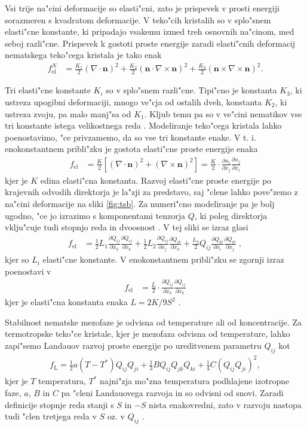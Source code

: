 \documentclass[12pt,twoside,openright,final]{report}
\renewcommand{\vec}{\mathbf}
\newcommand{\qodv}[2]{\ensuremath{\frac{\partial Q_{#1}}{\partial x_{#2}}}}
\newcommand{\nodv}[2]{\ensuremath{\frac{\partial n_{#1}}{\partial x_{#2}}}}
\begin{document}
Vsi trije na"cini deformacije so elasti"cni, zato je prispevek v prosti energiji sorazmeren s kvadratom deformacije. 
V teko"cih kristalih so v splo"snem elasti"cne konstante, ki pripadajo vsakemu izmed treh osnovnih na"cinom, med seboj razli"cne. 
Prispevek k gostoti proste energije zaradi elasti"cnih deformacij nematskega teko"cega kristala je tako enak
\begin{align}
 f_{\mathrm{el}}^N &= \frac{K_1}{2} (\nabla \cdot \vec n)^2 + \frac{K_2}{2} (\vec n \cdot \nabla \times \vec n)^2 + \frac{K_3}{2} (\vec n \times \nabla \times \vec n)^2. 
\end{align}

Tri elasti"cne konstante $K_i$ so v splo"snem razli"cne. Tipi"cno je konstanta $K_3$, ki ustreza upogibni deformaciji, mnogo ve"cja od ostalih dveh, konstanta $K_2$, ki ustreza zvoju, pa malo manj"sa od $K_1$. 
Kljub temu pa so v ve"cini nematikov vse tri konstante istega velikostnega reda \cite{degennes}. 
Modeliranje teko"cega kristala lahko poenostavimo, "ce privzamemo, da so vse tri konstante enake. 
V t. i. enokonstantnem pribli"zku je gostota elasti"cne proste energije enaka
\begin{align}
 f_{\mathrm{el}} &= \frac{K}{2} \left[(\nabla \cdot \vec n)^2 + (\nabla \times \vec n)^2\right] = \frac{K}{2} \cdot \nodv{i}{j}\nodv{j}{i}
\end{align}
kjer je $K$ edina elasti"cna konstanta.
Razvoj elasti"cne proste energije po krajevnih odvodih direktorja je la"zji za predstavo, saj "clene lahko pove"zemo z na"cini deformacije na sliki \ref{fig:tsb}. 
Za numeri"cno modeliranje pa je bolj ugodno, "ce jo izrazimo s komponentami tenzorja $Q$, ki poleg direktorja vklju"cuje tudi stopnjo reda in dvoosnost \cite{copar-phd}. 
V tej sliki se izraz glasi
\begin{align}
 f_{\mathrm{el}} &= \frac{1}{2}L_1\qodv{ij}{k}\qodv{ij}{k} + \frac{1}{2}L_2 \qodv{ij}{j}\qodv{ik}{k} + \frac{L_3}{2}Q_{ij}\qodv{kl}{i}\qodv{kl}{j}\;,
\end{align}
kjer so $L_i$ elasti"cne konstante. V enokonstantnem pribli"zku se zgornji izraz poenostavi v 
\begin{align}
f_{\mathrm{el}} &= \frac{L}{2} \cdot \qodv{ij}{k}\qodv{ij}{k} 
\end{align}
kjer je elasti"cna konstanta enaka $L = 2K/9S^2$ \cite{ravnik-zumer-ldg}. 

Stabilnost nematske mezofaze je odvisna od temperature ali od koncentracije. 
Za termotropske teko"ce kristale, kjer je mezofaza odvisna od temperature, lahko zapi"semo Landauov razvoj proste energije po ureditvenem parametru $Q_{ij}$ kot
\begin{align}
  f_{\mathrm{L}} = \frac{1}{2}a(T-T^\ast)Q_{ij}Q_{ji} + \frac{1}{3}BQ_{ij}Q_{jk}Q_{ki} + \frac{1}{4}C(Q_{ij}Q_{ji})^2,
\end{align}
kjer je $T$ temperatura, $T^\ast$ najni"zja mo"zna temperatura podhlajene izotropne faze, $a$, $B$ in $C$ pa "cleni Landauovega razvoja in so odvisni od snovi. 
Zaradi definicije stopnje reda stanji s $S$ in $-S$ nista enakovredni, zato v razvoju nastopa tudi "clen tretjega reda v $S$ oz. v $Q_{ij}$ \cite{degennes,ravnik-zumer-ldg}. 
\end{document}
